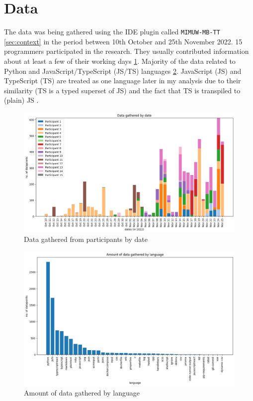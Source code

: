 \section{Data}

The data was being gathered using the IDE plugin called \texttt{MIMUW-MB-TT} \ref{sec:context} in the period between 10th October and 25th November 2022. 15 programmers participated in the research. They usually contributed information about at least a few of their working days \ref{fig:data_by_date}. Majority of the data related to Python and JavaScript/TypeScript (JS/TS) languages \ref{fig:data_by_langs}. JavaScript (JS) and TypeScript (TS) are treated as one language later in my analysis due to their similarity (TS is a typed superset of JS) and the fact that TS is transpiled to (plain) JS \cite{Mic22CompilingTS}.

\begin{figure}[htbp]
  \centering
  \includegraphics[scale=0.5]{chapters/methodology/graphics/data-gathered-dates.png}
  \caption{Data gathered from participants by date}
  \label{fig:data_by_date}
\end{figure}

\begin{figure}[htbp]
  \centering
  \includegraphics[scale=0.5]{chapters/results/graphics/languages-total.png}
  \caption{Amount of data gathered by language}
  \label{fig:data_by_langs}
\end{figure}
